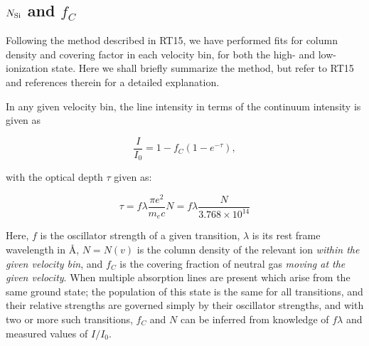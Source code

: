 \documentclass[twocolumn]{aastex61}
\begin{document}


\subsection{$N_{\rm Si}$ and $f_C$}\label{sec:aod}

Following the method described in RT15, we have performed fits for
column density and covering factor in each velocity bin, for both the
high- and low-ionization state. Here we shall briefly summarize the
method, but refer to RT15 and references therein for a detailed
explanation.

In any given velocity bin, the line intensity in terms of the continuum
intensity is given as

%
\begin{equation*}
\frac{I}{I_0} = 1 - f_C (1 - e^{-\tau}), 
\end{equation*}
%

with the optical depth $\tau$ given as:

%
\begin{equation*}
\tau = f\lambda \frac{\pi e^2}{m_e c} N 
       = f\lambda \frac{N}{3.768 \times 10^{14}} 
\end{equation*}
%

Here, $f$ is the oscillator strength of a given transition, $\lambda$ is
its rest frame wavelength in Å, $N = N(v)$ is the column density of the
relevant ion \emph{within the given velocity bin}, and $f_{C}$ is the
covering fraction of neutral gas \emph{moving at the given velocity}.
When multiple absorption lines are present which arise from the same
ground state; the population of this state is the same for all
transitions, and their relative strengths are governed simply by their
oscillator strengths, and with two or more such transitions, $f_{C}$ and
$N$ can be inferred from knowledge of $f \lambda$ and measured values of
$I/I_0$.
\end{document}
